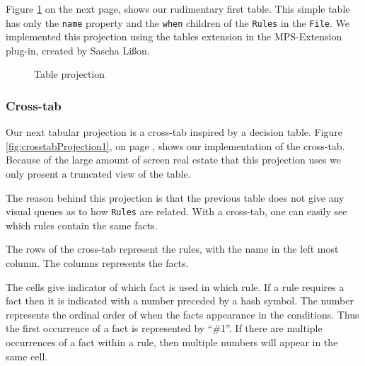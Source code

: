 Figure \ref{fig:tableProjection1} on the next page, shows our rudimentary first table.
This simple table has only the \texttt{name} property and the \texttt{when} children of the \texttt{Rules} in the \texttt{File}.
We implemented this projection using the tables extension in the MPS-Extension plug-in, created by Sascha Lißon.

\begin{figure}
    \centering
    \caption{Table projection}
    \label{fig:tableProjection1}
\end{figure}

\subsubsection{Cross-tab}
Our next tabular projection is a cross-tab inspired by a decision table.
Figure \ref{fig:crosstabProjection1}, on page \pageref{fig:crosstabProjection1}, shows our implementation of the cross-tab.
Because of the large amount of screen real estate that this projection uses we only present a truncated view of the table.

The reason behind this projection is that the previous table does not give any visual queues as to how \texttt{Rules} are related.
With a cross-tab, one can easily see which rules contain the same facts.

The rows of the cross-tab represent the rules, with the name in the left most column.
The columns represents the facts.

The cells give indicator of which fact is used in which rule.
If a rule requires a fact then it is indicated with a number preceded by a hash symbol.
The number represents the ordinal order of when the facts appearance in the conditions.
Thus the first occurrence of a fact is represented by ``\#1''.
If there are multiple occurrences of a fact within a rule, then multiple numbers will appear in the same cell.

